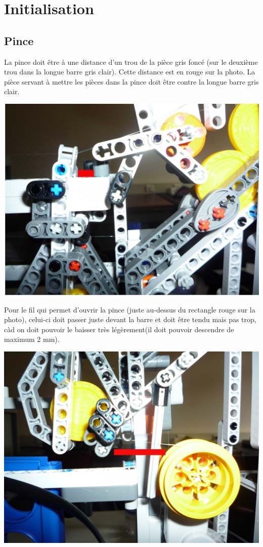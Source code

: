 \documentclass[12pt]{report}
\begin{document}
\chapter*{Initialisation}

\section{Pince}
La pince doit être à une distance d'un trou de la pièce gris foncé 
(sur le deuxième trou dans la longue barre gris clair). Cette 
distance est en rouge sur la photo. La pièce servant à mettre les 
pièces dans la pince doit être contre la longue barre gris clair.
\begin{center}
		\includegraphics[width=0.7\linewidth]{images/posInitPince.JPG}
\end{center}


Pour le fil qui permet d'ouvrir la pince (juste au-dessus du rectangle
rouge sur la photo), celui-ci doit passer juste devant la barre et doit
être tendu mais pas trop, càd on doit pouvoir le baisser très 
légèrement(il doit pouvoir descendre de maximum 2 mm).

\begin{center}
		\includegraphics[width=0.7\linewidth]{images/InitFilePince.JPG}
\end{center}
\end{document}
